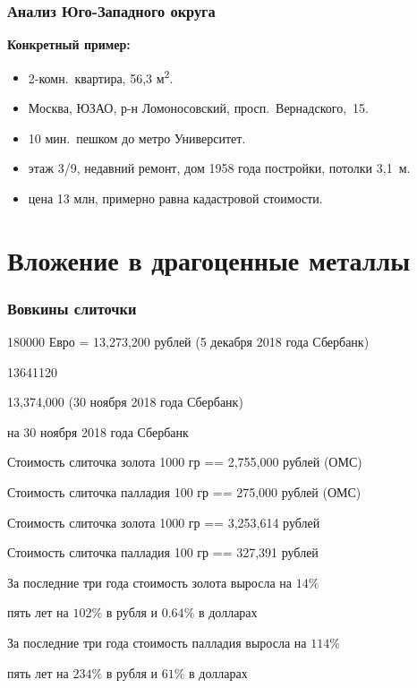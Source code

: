 \documentclass{beamer}
\begin{document}
		\begin{frame}
			\frametitle{Анализ Юго-Западного округа}
			\textbf{Конкретный пример:}
				\begin{itemize}
				\item 2-комн.\ квартира, 56,3 м\textsuperscript{2}.
				\item Москва, ЮЗАО, р-н Ломоносовский, просп.\ Вернадского,~15.
				\item 10 мин.\ пешком до метро Университет.
				\item этаж 3/9, недавний ремонт, дом 1958 года постройки, потолки 3,1~м.
				\item цена 13 млн, примерно равна кадастровой стоимости.
				\end{itemize}
			
		
		\end{frame}
		
		\begin{frame}
			\frametitle{}
		
		
		\end{frame}

	\section[Металлы]{Вложение в драгоценные металлы}

		\begin{frame}
			\frametitle{Вовкины слиточки}	
		
				180000 Евро = 13,273,200 рублей (5 декабря 2018 года Сбербанк)
							  
							  13641120 
							  
							  13,374,000 (30 ноября 2018 года Сбербанк)
				
				на 30 ноября 2018 года Сбербанк
				
				Стоимость слиточка золота 1000 гр == 2,755,000	рублей (ОМС)
				
				Стоимость слиточка палладия 100 гр == 275,000 рублей	(ОМС)	  
				
				Стоимость слиточка золота 1000 гр == 3,253,614	рублей 
				
				Стоимость слиточка палладия 100 гр == 327,391 рублей
				
				За последние три года стоимость золота выросла на $14\%$
				
				\qquad\qquad\qquad		пять лет на $102\%$	 в рубля и $0.64\%$ в долларах	
					
				За последние три года стоимость палладия выросла на $114\%$
				
				\qquad\qquad\qquad			пять лет на $234\%$	 в рубля и $61\%$ в долларах

		\end{frame}
		
\end{document}
